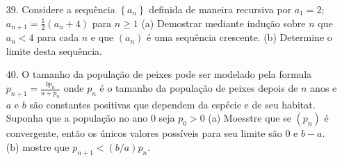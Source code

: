 \begin{itemize}
	\item [39.] Considere a sequência $\left\lbrace a_{n}\right\rbrace $ definida de maneira recursiva por $a_{1}=2$; $a_{n+1}=\frac{1}{2}(a_{n}+4)$ para $n\geq 1$ (a) Demostrar mediante indução sobre $n$ que $a_{n}<4$ para cada $n$ e que $(a_{n})$ é uma sequência crescente. (b) Determine o limite desta sequência.
\end{itemize}
\begin{itemize}
	\item [40.] O tamanho da população de peixes pode ser modelado pela formula $p_{n+1}=\frac{bp_{n}}{a+p_{n}}$ onde $p_{n}$ é o tamanho da população de peixes depois de $n$ anos e $a$ e $b$ são constantes positivas que dependem da espécie e de seu habitat. Suponha que a população no ano 0 seja $p_{0}>0$ (a) Moesstre que se $(p_{n})$ é convergente, então os únicos valores possíveis para seu limite são $0$ e $b-a$. (b) mostre que $p_{n+1}<(b/a)p_{n}$.
\end{itemize}
























